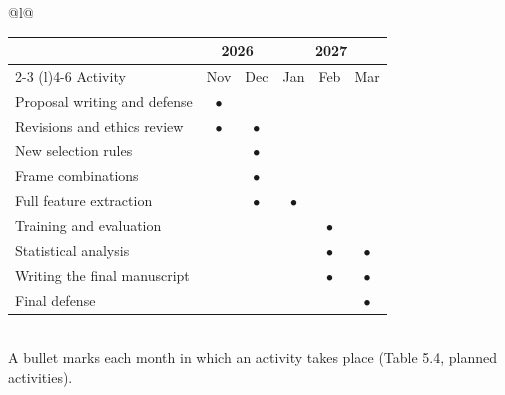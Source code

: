 \documentclass[12pt,border=10pt]{standalone}
\newcommand{\B}{$\bullet$}
\begin{document}
\setlength{\tabcolsep}{7pt}
\renewcommand{\arraystretch}{1.25}
\begin{tabular}{@{}l@{}}
\begin{tabular}{@{}l*{5}{c}@{}}
   \toprule
   & \multicolumn{2}{c}{2026} & \multicolumn{3}{c}{2027} \\
   \cmidrule(lr){2-3} \cmidrule(l){4-6}
   Activity & Nov & Dec & Jan & Feb & Mar \\
   \midrule
   Proposal writing and defense & \B & & & & \\
   Revisions and ethics review & \B & \B & & & \\
   New selection rules & & \B & & & \\
   Frame combinations & & \B & & & \\
   Full feature extraction & & \B & \B & & \\
   Training and evaluation & & & & \B & \\
   Statistical analysis & & & & \B & \B \\
   Writing the final manuscript & & & & \B & \B \\
   Final defense & & & & & \B \\
   \bottomrule
\end{tabular}\\[4pt]
{\small\textcolor{inktwo}{A bullet marks each month in which an activity takes place (Table 5.4, planned activities).}}
\end{tabular}
\end{document}
